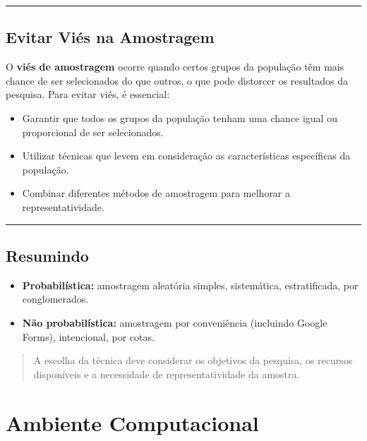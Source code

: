\documentclass[
]{book}
\providecommand{\tightlist}{%
  \setlength{\itemsep}{0pt}\setlength{\parskip}{0pt}}
\begin{document}
\begin{center}\rule{0.5\linewidth}{0.5pt}\end{center}

\section{Evitar Viés na Amostragem}\label{evitar-viuxe9s-na-amostragem}

O \textbf{viés de amostragem} ocorre quando certos grupos da população têm mais chance de ser selecionados do que outros, o que pode distorcer os resultados da pesquisa. Para evitar viés, é essencial:

\begin{itemize}
\tightlist
\item
  Garantir que todos os grupos da população tenham uma chance igual ou proporcional de ser selecionados.
\item
  Utilizar técnicas que levem em consideração as características específicas da população.
\item
  Combinar diferentes métodos de amostragem para melhorar a representatividade.
\end{itemize}

\begin{center}\rule{0.5\linewidth}{0.5pt}\end{center}

\section{Resumindo}\label{resumindo}

\begin{itemize}
\tightlist
\item
  \textbf{Probabilística:} amostragem aleatória simples, sistemática, estratificada, por conglomerados.
\item
  \textbf{Não probabilística:} amostragem por conveniência (incluindo Google Forms), intencional, por cotas.
\end{itemize}

\begin{quote}
A escolha da técnica deve considerar os objetivos da pesquisa, os recursos disponíveis e a necessidade de representatividade da amostra.
\end{quote}

\chapter{Ambiente Computacional}\label{ambiente-computacional}
\end{document}
